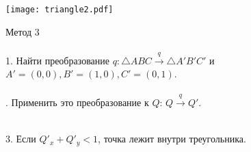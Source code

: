 \documentclass[10pt]{beamer}
\begin{document}
{
	{
		\texttt{[image: triangle2.pdf]} 

	}
	{
		Метод 3 \\ ~ \\
		
		1. Найти преобразование $q: \triangle ABC \xrightarrow{q} \triangle A'B'C'$ и $A'=(0,0), B'=(1,0), C'=(0,1) $. 	\\ ~ \\
		
		. Применить это преобразование к $Q$: $Q \xrightarrow{q} Q'$. \\ ~ \\
		
		\pause
		
		3. Если $Q '_x+Q '_y < 1$, точка лежит внутри треугольника.
		
	}
	
	
}
\end{document}
